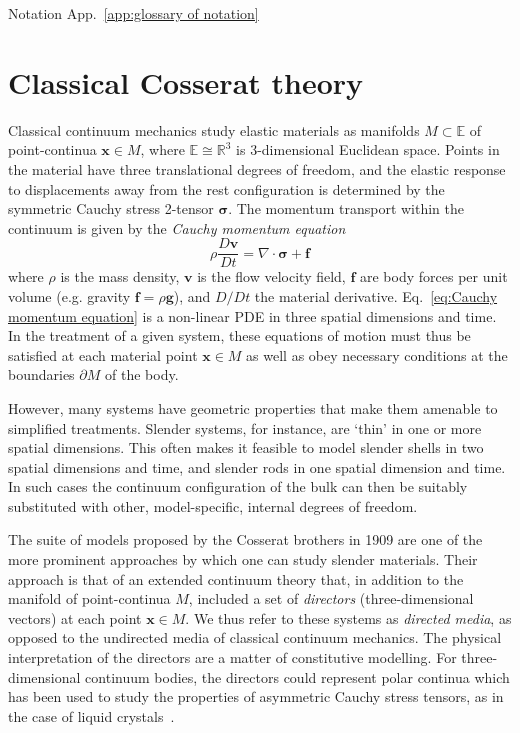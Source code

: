 Notation App.~\ref{app:glossary of notation}


\section{Classical Cosserat theory} \label{sec:Classical Cosserat theory}

Classical continuum mechanics study elastic materials as manifolds $M \subset \mathbb{E}$ of point-continua $\mathbf{x} \in M$, where $\mathbb{E} \cong \mathbb{R}^3$ is 3-dimensional Euclidean space. Points in the material have three translational degrees of freedom, and the elastic response to displacements away from the rest configuration is determined by the symmetric Cauchy stress 2-tensor $\boldsymbol{\sigma}$. The momentum transport within the continuum is given by the \textit{Cauchy momentum equation}
\begin{equation} \label{eq:Cauchy momentum equation}
\rho \frac{D \mathbf{v} }{D t} = \nabla \cdot \boldsymbol{\sigma} + \mathbf{f}
\end{equation}
where $\rho$ is the mass density, $\mathbf{v}$ is the flow velocity field, $\mathbf{f}$ are body forces per unit volume (e.g. gravity $\mathbf{f} = \rho \mathbf{g}$), and $D/Dt$ the material derivative. Eq.~\eqref{eq:Cauchy momentum equation} is a non-linear PDE in three spatial dimensions and time. In the treatment of a given system, these equations of motion must thus be satisfied at each material point $\mathbf{x} \in M$ as well as obey necessary conditions at the boundaries $\partial M$ of the body.

However, many systems have geometric properties that make them amenable to simplified treatments. Slender systems, for instance, are `thin' in one or more spatial dimensions. This often makes it feasible to model slender shells in two spatial dimensions and time, and slender rods in one spatial dimension and time. In such cases the continuum configuration of the bulk can then be suitably substituted with other, model-specific, internal degrees of freedom.

The suite of models proposed by the Cosserat brothers \citep{cosseratTheoryDeformableBodies1909} in 1909 are one of the more prominent approaches by which one can study slender materials. Their approach is that of an extended continuum theory that, in addition to the manifold of point-continua $M$, included a set of \textit{directors} (three-dimensional vectors) at each point $\mathbf{x} \in M$. We thus refer to these systems as \textit{directed media}, as opposed to the undirected media of classical continuum mechanics. The physical interpretation of the directors are a matter of constitutive modelling. For three-dimensional continuum bodies, the directors could represent polar continua which has been used to study the properties of asymmetric Cauchy stress tensors, as in the case of liquid crystals~\citep{ericksenConservationLawsLiquid1961}.

